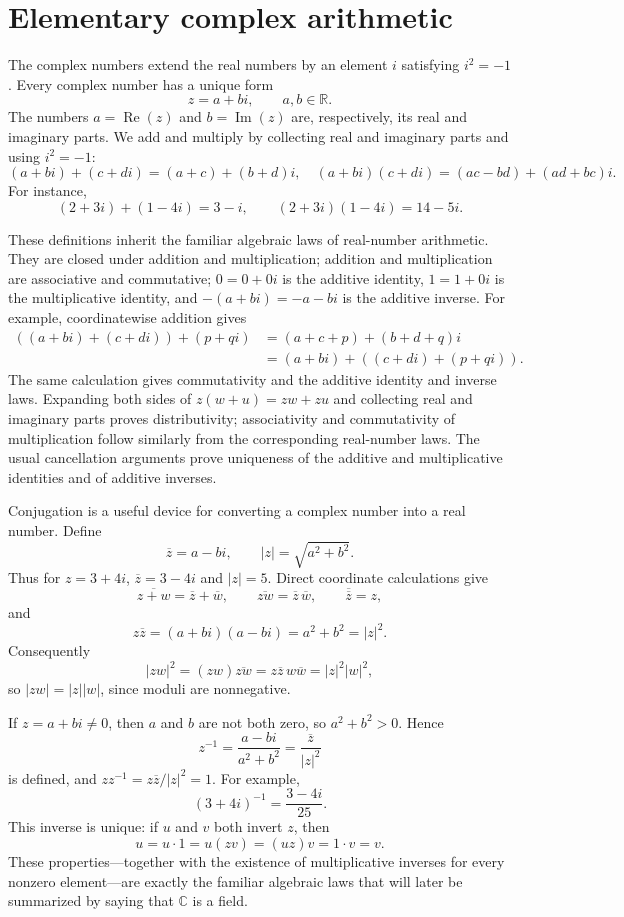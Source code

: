 \section{Elementary complex arithmetic}

The complex numbers extend the real numbers by an element \(i\) satisfying
\(i^2=-1\). Every complex number has a unique form
\[
z=a+bi,\qquad a,b\in\mathbb R.
\]
The numbers \(a=\operatorname{Re}(z)\) and \(b=\operatorname{Im}(z)\) are,
respectively, its real and imaginary parts. We add and multiply by collecting
real and imaginary parts and using \(i^2=-1\):
\[
(a+bi)+(c+di)=(a+c)+(b+d)i,
\quad
(a+bi)(c+di)=(ac-bd)+(ad+bc)i.
\]
For instance,
\[
(2+3i)+(1-4i)=3-i,\qquad
(2+3i)(1-4i)=14-5i.
\]

These definitions inherit the familiar algebraic laws of real-number
arithmetic. They are closed under addition and multiplication; addition and
multiplication are associative and commutative; \(0=0+0i\) is the additive
identity, \(1=1+0i\) is the multiplicative identity, and
\(-(a+bi)=-a-bi\) is the additive inverse. For example, coordinatewise
addition gives
\begin{align*}
((a+bi)+(c+di))+(p+qi)
&=(a+c+p)+(b+d+q)i\\
&=(a+bi)+((c+di)+(p+qi)).
\end{align*}
The same calculation gives commutativity and the additive identity and inverse
laws. Expanding both sides of \(z(w+u)=zw+zu\) and collecting real and
imaginary parts proves distributivity; associativity and commutativity of
multiplication follow similarly from the corresponding real-number laws.
The usual cancellation arguments prove uniqueness of the additive and
multiplicative identities and of additive inverses.

Conjugation is a useful device for converting a complex number into a real
number. Define
\[
\overline z=a-bi,\qquad |z|=\sqrt{a^2+b^2}.
\]
Thus for \(z=3+4i\), \(\overline z=3-4i\) and \(|z|=5\). Direct coordinate
calculations give
\[
\overline{z+w}=\overline z+\overline w,\qquad
\overline{zw}=\overline z\,\overline w,\qquad
\overline{\overline z}=z,
\]
and
\[
z\overline z=(a+bi)(a-bi)=a^2+b^2=|z|^2.
\]
Consequently
\[
|zw|^2=(zw)\overline{zw}=z\overline z\,w\overline w=|z|^2|w|^2,
\]
so \(|zw|=|z||w|\), since moduli are nonnegative.

If \(z=a+bi\ne0\), then \(a\) and \(b\) are not both zero, so
\(a^2+b^2>0\). Hence
\[
z^{-1}=\frac{a-bi}{a^2+b^2}=\frac{\overline z}{|z|^2}
\]
is defined, and \(zz^{-1}=z\overline z/|z|^2=1\). For example,
\[
(3+4i)^{-1}=\frac{3-4i}{25}.
\]
This inverse is unique: if \(u\) and \(v\) both invert \(z\), then
\[
u=u\cdot1=u(zv)=(uz)v=1\cdot v=v.
\]
These properties---together with the existence of multiplicative inverses for
every nonzero element---are exactly the familiar algebraic laws that will
later be summarized by saying that \(\mathbb C\) is a field.

